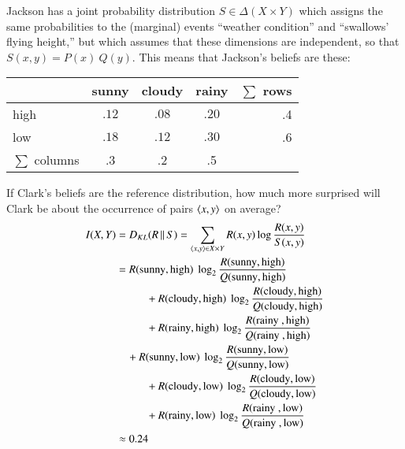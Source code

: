 \documentclass[nobib,nofonts]{tufte-handout}
\begin{document}
\begin{example}
\begin{center}
  \end{center}
  Jackson has a joint probability distribution $S \in \Delta(X \times Y)$ which assigns the same probabilities to the (marginal) events ``weather condition'' and ``swallows' flying height,'' but which assumes that these dimensions are independent, so that $S(x,y) = P(x) \ Q(y)$.
  This means that Jackson's beliefs are these:
  \begin{center}
    \begin{tabular}{lcccr}
                     & sunny & cloudy & rainy & $\sum$ rows \\ \midrule
      high           & $.12$ & $.08$  & $.20$ & .4 \\
      low            & $.18$ & $.12$  & $.30$ & .6 \\ \midrule
      $\sum$ columns & .3    & .2     & .5
    \end{tabular}
  \end{center}
  If Clark's beliefs are the reference distribution, how much more surprised will Clark be about the occurrence of pairs $\left \langle x,y\right\rangle$ on average?
  \begin{align*}
    I(X,Y) & =  D_{KL}(R \,||\, S) = \sum_{\tuple{x,y} \in X \times Y} R(x,y) \log \frac{R(x,y)}{S(x,y)} \\
           & = R(\text{sunny} , \text{high}) \ \log_{2} \frac{R(\text{sunny} , \text{high})}{Q(\text{sunny} , \text{high})}  \\
           & \ \ \ \ \ \ \ \ \ \ \ + R(\text{cloudy} , \text{high}) \ \log_{2} \frac{R(\text{cloudy} , \text{high})}{Q(\text{cloudy} , \text{high})} \\
           & \ \ \ \ \ \ \ \ \ \ \ + R(\text{rainy} , \text{high}) \ \log_{2} \frac{R(\text{rainy } , \text{high})}{Q(\text{rainy } , \text{high})} \\
           & \ \ \ \ +  R(\text{sunny} , \text{low}) \ \log_{2} \frac{R(\text{sunny} , \text{low})}{Q(\text{sunny} , \text{low})}  \\
           & \ \ \ \ \ \ \ \ \ \ \ + R(\text{cloudy} , \text{low}) \ \log_{2} \frac{R(\text{cloudy} , \text{low})}{Q(\text{cloudy} , \text{low})} \\
           & \ \ \ \ \ \ \ \ \ \ \ + R(\text{rainy} , \text{low}) \ \log_{2} \frac{R(\text{rainy } , \text{low})}{Q(\text{rainy } , \text{low})} \\
    & \approx 0.24
  \end{align*}
\end{example}

\newpage
\end{document}
